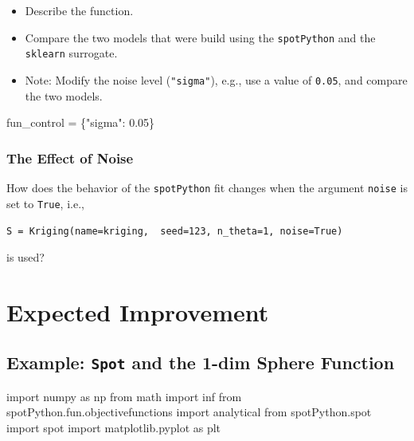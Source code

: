 \documentclass[
  letterpaper,
  DIV=11,
  numbers=noendperiod]{scrreprt}
\newenvironment{Shaded}{\begin{snugshade}}{\end{snugshade}}
\newcommand{\FloatTok}[1]{\textcolor[rgb]{0.68,0.00,0.00}{#1}}
\newcommand{\ImportTok}[1]{\textcolor[rgb]{0.00,0.46,0.62}{#1}}
\newcommand{\NormalTok}[1]{\textcolor[rgb]{0.00,0.23,0.31}{#1}}
\newcommand{\OperatorTok}[1]{\textcolor[rgb]{0.37,0.37,0.37}{#1}}
\newcommand{\StringTok}[1]{\textcolor[rgb]{0.13,0.47,0.30}{#1}}
\providecommand{\tightlist}{%
  \setlength{\itemsep}{0pt}\setlength{\parskip}{0pt}}\usepackage{longtable,booktabs,array}
\begin{document}
\begin{itemize}
\tightlist
\item
  Describe the function.
\item
  Compare the two models that were build using the \texttt{spotPython}
  and the \texttt{sklearn} surrogate.
\item
  Note: Modify the noise level (\texttt{"sigma"}), e.g., use a value of
  \texttt{0.05}, and compare the two models.
\end{itemize}

\begin{Shaded}
\begin{Highlighting}[]
\NormalTok{fun\_control }\OperatorTok{=}\NormalTok{ \{}\StringTok{"sigma"}\NormalTok{: }\FloatTok{0.05}\NormalTok{\}}
\end{Highlighting}
\end{Shaded}

\hypertarget{the-effect-of-noise}{%
\subsection{The Effect of Noise}\label{the-effect-of-noise}}

How does the behavior of the \texttt{spotPython} fit changes when the
argument \texttt{noise} is set to \texttt{True}, i.e.,

\texttt{S\ =\ Kriging(name=\textquotesingle{}kriging\textquotesingle{},\ \ seed=123,\ n\_theta=1,\ noise=True)}

is used?

\hypertarget{sec-expected-improvement}{%
\chapter{Expected Improvement}\label{sec-expected-improvement}}

\hypertarget{example-spot-and-the-1-dim-sphere-function}{%
\section{\texorpdfstring{Example: \texttt{Spot} and the 1-dim Sphere
Function}{Example: Spot and the 1-dim Sphere Function}}\label{example-spot-and-the-1-dim-sphere-function}}

\begin{Shaded}
\begin{Highlighting}[]
\ImportTok{import}\NormalTok{ numpy }\ImportTok{as}\NormalTok{ np}
\ImportTok{from}\NormalTok{ math }\ImportTok{import}\NormalTok{ inf}
\ImportTok{from}\NormalTok{ spotPython.fun.objectivefunctions }\ImportTok{import}\NormalTok{ analytical}
\ImportTok{from}\NormalTok{ spotPython.spot }\ImportTok{import}\NormalTok{ spot}
\ImportTok{import}\NormalTok{ matplotlib.pyplot }\ImportTok{as}\NormalTok{ plt}
\end{Highlighting}
\end{Shaded}
\end{document}
